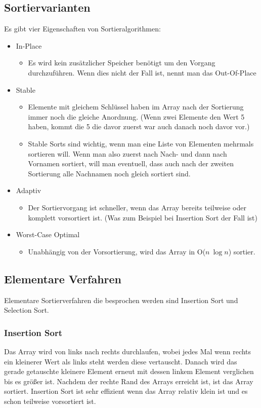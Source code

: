 \documentclass{article}
\begin{document}
	\subsection{Sortiervarianten}
	Es gibt vier Eigenschaften von Sortieralgorithmen:
	\begin{itemize}
		\item{In-Place}
		\begin{itemize}
			\item{Es wird kein zusätzlicher Speicher benötigt um den Vorgang durchzuführen. Wenn dies nicht der Fall ist, nennt man das Out-Of-Place}
		\end{itemize}
		\item{Stable}
		\begin{itemize}
			\item{Elemente mit gleichem Schlüssel haben im Array nach der Sortierung immer noch die gleiche Anordnung. (Wenn zwei Elemente den Wert 5 haben, kommt die 5 die davor zuerst war auch danach noch davor vor.)}
			\item{Stable Sorts sind wichtig, wenn man eine Liste von Elementen mehrmals sortieren will. Wenn man also zuerst nach Nach- und dann nach Vornamen sortiert, will man eventuell, dass auch nach der zweiten Sortierung alle Nachnamen noch gleich sortiert sind.}
		\end{itemize}
		\item{Adaptiv}
		\begin{itemize}
			\item{Der Sortiervorgang ist schneller, wenn das Array bereits teilweise oder komplett vorsortiert ist. (Was zum Beispiel bei Insertion Sort der Fall ist)}
		\end{itemize}
		\item{Worst-Case Optimal}
		\begin{itemize}
			\item{Unabhängig von der Vorsortierung, wird das Array in O($n\ \log n$) sortier.}
		\end{itemize}
	\end{itemize}

	\subsection{Elementare Verfahren}
	Elementare Sortierverfahren die besprochen werden sind Insertion Sort und Selection Sort.
	\subsubsection{Insertion Sort}
	Das Array wird von links nach rechts durchlaufen, wobei jedes Mal wenn rechts ein kleinerer Wert als links steht werden diese vertauscht. Danach wird das gerade getauschte kleinere Element erneut mit dessen linkem Element verglichen bis es größer ist. Nachdem der rechte Rand des Arrays erreicht ist, ist das Array sortiert. Insertion Sort ist sehr effizient wenn das Array relativ klein ist und es schon teilweise vorsortiert ist.
\end{document}
